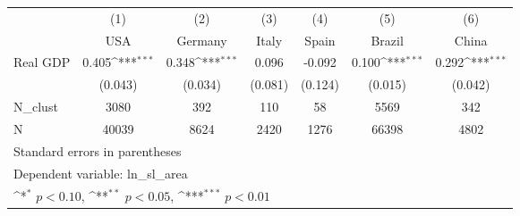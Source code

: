 {
\def\sym#1{\ifmmode^{#1}\else\(^{#1}\)\fi}
\begin{tabular}{l*{6}{c}}
\hline\hline
            &\multicolumn{1}{c}{(1)}&\multicolumn{1}{c}{(2)}&\multicolumn{1}{c}{(3)}&\multicolumn{1}{c}{(4)}&\multicolumn{1}{c}{(5)}&\multicolumn{1}{c}{(6)}\\
            &\multicolumn{1}{c}{USA}&\multicolumn{1}{c}{Germany}&\multicolumn{1}{c}{Italy}&\multicolumn{1}{c}{Spain}&\multicolumn{1}{c}{Brazil}&\multicolumn{1}{c}{China}\\
\hline
Real GDP    &       0.405\sym{***}&       0.348\sym{***}&       0.096         &      -0.092         &       0.100\sym{***}&       0.292\sym{***}\\
            &     (0.043)         &     (0.034)         &     (0.081)         &     (0.124)         &     (0.015)         &     (0.042)         \\
\hline
N\_clust     &        3080         &         392         &         110         &          58         &        5569         &         342         \\
N           &       40039         &        8624         &        2420         &        1276         &       66398         &        4802         \\
\hline\hline
\multicolumn{7}{l}{\footnotesize Standard errors in parentheses}\\
\multicolumn{7}{l}{\footnotesize Dependent variable: ln\_sl\_area}\\
\multicolumn{7}{l}{\footnotesize \sym{*} \(p<0.10\), \sym{**} \(p<0.05\), \sym{***} \(p<0.01\)}\\
\end{tabular}
}
